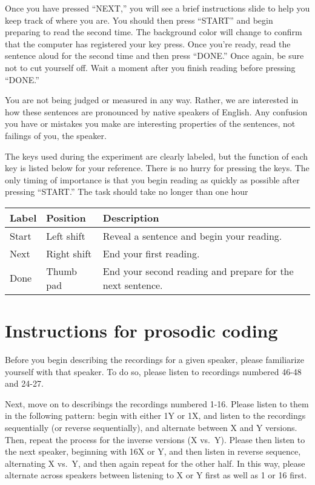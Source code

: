 \documentclass[11pt,oneside]{book}
\begin{document}
Once you have pressed ``NEXT,'' you will see a brief instructions slide to help you keep track of where you are. You should then press ``START'' and begin preparing to read the second time. The background color will change to confirm that the computer has registered your key press. Once you're ready, read the sentence aloud for the second time and then press ``DONE.'' Once again, be sure not to cut yourself off. Wait a moment after you finish reading before pressing ``DONE.''

You are not being judged or measured in any way. Rather, we are interested in how these sentences are pronounced by native speakers of English. Any confusion you have or mistakes you make are interesting properties of the sentences, not failings of you, the speaker.

The keys used during the experiment are clearly labeled, but the function of each key is listed below for your reference. There is no hurry for pressing the keys. The only timing of importance is that you begin reading as quickly as possible after pressing ``START.'' The task should take no longer than one hour

\begin{table}[!h]
\centering
\begin{tabular}{lll}
\toprule
Label & Position & Description\\
\midrule
Start & Left shift & Reveal a sentence and begin your reading.\\
Next & Right shift & End your first reading.\\
Done & Thumb pad & End your second reading and prepare for the next sentence.\\
\bottomrule
\end{tabular}
\end{table}

\newpage

\hypertarget{RA}{%
\chapter{Instructions for prosodic coding}\label{RA}}

Before you begin describing the recordings for a given speaker, please familiarize yourself with that speaker. To do so, please listen to recordings numbered 46-48 and 24-27.

Next, move on to describings the recordings numbered 1-16. Please listen to them in the following pattern: begin with either 1Y or 1X, and listen to the recordings sequentially (or reverse sequentially), and alternate between X and Y versions. Then, repeat the process for the inverse versions (X vs.~Y). Please then listen to the next speaker, beginning with 16X or Y, and then listen in reverse sequence, alternating X vs.~Y, and then again repeat for the other half. In this way, please alternate across speakers between listening to X or Y first as well as 1 or 16 first.
\end{document}
